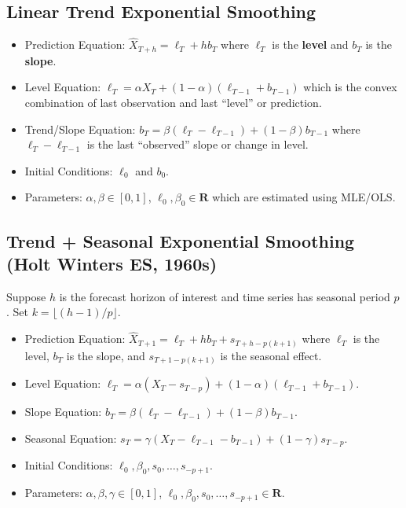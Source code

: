 \subsection*{Linear Trend Exponential Smoothing}
\begin{itemize}
      \item Prediction Equation: $ \hat{X}_{T+h}=\ell_T+h b_T $ where $ \ell_T $
            is the \textbf{level} and $ b_T $ is the \textbf{slope}.
      \item Level Equation: $ \ell_T=\alpha X_T+(1-\alpha)(\ell_{T-1}+b_{T-1}) $
            which is the convex combination of last observation and last ``level''
            or prediction.
      \item Trend/Slope Equation: $ b_T=\beta(\ell_T-\ell_{T-1})+(1-\beta)b_{T-1} $
            where $ \ell_T-\ell_{T-1} $ is the last ``observed'' slope or change in level.
      \item Initial Conditions: $ \ell_0 $ and $ b_0 $.
      \item Parameters: $ \alpha,\beta\in[0,1] $, $ \ell_0,\beta_0\in\mathbf{R} $
            which are estimated using MLE/OLS\@.
\end{itemize}

\subsection*{Trend + Seasonal Exponential Smoothing (Holt Winters ES, 1960s)}
Suppose $ h $ is the forecast horizon of interest and time series has seasonal
period $ p $. Set $ k=\lfloor (h-1)/p\rfloor $.
\begin{itemize}
      \item Prediction Equation: $ \hat{X}_{T+1}=\ell_T+h b_T+s_{T+h-p(k+1)} $
            where $ \ell_T $ is the level, $ b_T $ is the slope, and
            $ s_{T+1-p(k+1)} $ is the seasonal effect.
      \item Level Equation: $ \ell_T=\alpha(X_T-s_{T-p})+(1-\alpha)(\ell_{T-1}+b_{T-1}) $.
      \item Slope Equation: $ b_T=\beta(\ell_T-\ell_{T-1})+(1-\beta)b_{T-1} $.
      \item Seasonal Equation: $ s_T=\gamma(X_T-\ell_{T-1}-b_{T-1})+(1-\gamma)s_{T-p} $.
      \item Initial Conditions: $ \ell_0,\beta_0,s_0,\ldots,s_{-p+1} $.
      \item Parameters: $ \alpha,\beta,\gamma\in[0,1] $, $ \ell_0,\beta_0,s_0,\ldots,s_{-p+1}\in\mathbf{R} $.
\end{itemize}

